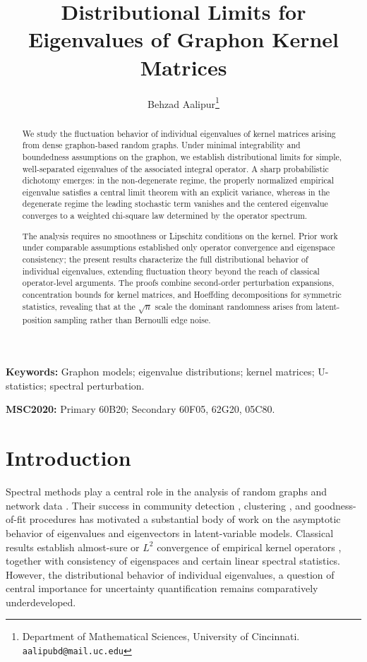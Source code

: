 \documentclass[11pt]{article}
\title{\textbf{Distributional Limits for Eigenvalues of Graphon Kernel Matrices}}
\author{
  Behzad Aalipur\thanks{
    Department of Mathematical Sciences, University of Cincinnati.
    \texttt{aalipubd@mail.uc.edu}
  }
}
\date{}
\theoremstyle{plain}
\theoremstyle{remark}
\begin{document}
\maketitle

\begin{abstract}
We study the fluctuation behavior of individual eigenvalues of kernel matrices arising from dense graphon-based random graphs. Under minimal integrability and boundedness assumptions on the graphon, we establish distributional limits for simple, well-separated eigenvalues of the associated integral operator. A sharp probabilistic dichotomy emerges: in the non-degenerate regime, the properly normalized empirical eigenvalue satisfies a central limit theorem with an explicit variance, whereas in the degenerate regime the leading stochastic term vanishes and the centered eigenvalue converges to a weighted chi-square law determined by the operator spectrum.

The analysis requires no smoothness or Lipschitz conditions on the kernel. Prior work under comparable assumptions established only operator convergence and eigenspace consistency; the present results characterize the full distributional behavior of individual eigenvalues, extending fluctuation theory beyond the reach of classical operator-level arguments. The proofs combine second-order perturbation expansions, concentration bounds for kernel matrices, and Hoeffding decompositions for symmetric statistics, revealing that at the $\sqrt{n}$ scale the dominant randomness arises from latent-position sampling rather than Bernoulli edge noise.
\end{abstract}

\textbf{Keywords:} Graphon models; eigenvalue distributions; kernel matrices; U-statistics; spectral perturbation.

\textbf{MSC2020:} Primary 60B20; Secondary 60F05, 62G20, 05C80.


\section{Introduction}

Spectral methods play a central role in the analysis of random graphs and network data 
\cite{lei2015consistency,rohe2011spectral}. Their success in community detection 
\cite{abbe2017community,lei2015consistency,zhao2012consistency}, clustering 
\cite{von2007tutorial}, and goodness-of-fit procedures \cite{bickel2011method,gao2015rate} 
has motivated a substantial body of work on the asymptotic behavior of eigenvalues and 
eigenvectors in latent-variable models. Classical results establish almost-sure or $L^2$ 
convergence of empirical kernel operators \cite{koltchinskii2000random,karoui2008spectrum,braun2006accurate}, 
together with consistency of eigenspaces and certain linear spectral statistics. 
However, the distributional behavior of individual eigenvalues, a question of central 
importance for uncertainty quantification remains comparatively underdeveloped.
\end{document}
